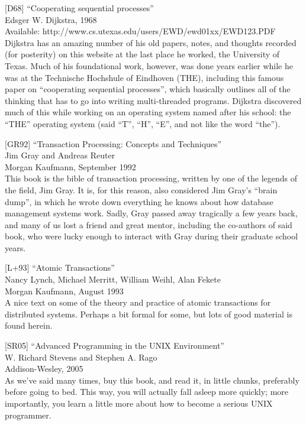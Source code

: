 {[}D68{]} ``Cooperating sequential processes''\\
Edsger W. Dijkstra, 1968\\
Available: http://www.cs.utexas.edu/users/EWD/ewd01xx/EWD123.PDF\\
Dijkstra has an amazing number of his old papers, notes, and thoughts
recorded (for posterity) on this website at the last place he worked,
the University of Texas. Much of his foundational work, however, was
done years earlier while he was at the Technische Hochshule of Eindhoven
(THE), including this famous paper on ``cooperating sequential
processes'', which basically outlines all of the thinking that has to go
into writing multi-threaded programs. Dijkstra discovered much of this
while working on an operating system named after his school: the ``THE''
operating system (said ``T'', ``H'', ``E'', and not like the word
``the'').

{[}GR92{]} ``Transaction Processing: Concepts and Techniques''\\
Jim Gray and Andreas Reuter\\
Morgan Kaufmann, September 1992\\
This book is the bible of transaction processing, written by one of the
legends of the field, Jim Gray. It is, for this reason, also considered
Jim Gray's ``brain dump'', in which he wrote down everything he knows
about how database management systems work. Sadly, Gray passed away
tragically a few years back, and many of us lost a friend and great
mentor, including the co-authors of said book, who were lucky enough to
interact with Gray during their graduate school years.

{[}L+93{]} ``Atomic Transactions''\\
Nancy Lynch, Michael Merritt, William Weihl, Alan Fekete\\
Morgan Kaufmann, August 1993\\
A nice text on some of the theory and practice of atomic transactions
for distributed systems. Perhaps a bit formal for some, but lots of good
material is found herein.

{[}SR05{]} ``Advanced Programming in the UNIX Environment''\\
W. Richard Stevens and Stephen A. Rago\\
Addison-Wesley, 2005\\
As we've said many times, buy this book, and read it, in little chunks,
preferably before going to bed. This way, you will actually fall asleep
more quickly; more importantly, you learn a little more about how to
become a serious UNIX programmer.

